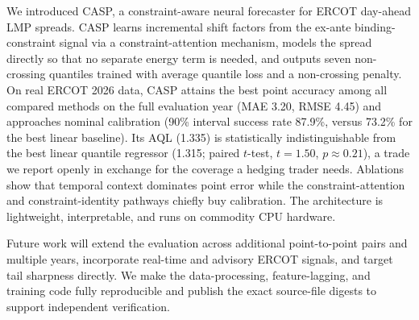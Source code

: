 \documentclass{article}
\begin{document}
We introduced CASP, a constraint-aware neural forecaster for ERCOT day-ahead LMP spreads. CASP learns incremental shift factors from the ex-ante binding-constraint signal via a constraint-attention mechanism, models the spread directly so that no separate energy term is needed, and outputs seven non-crossing quantiles trained with average quantile loss and a non-crossing penalty. On real ERCOT 2026 data, CASP attains the best point accuracy among all compared methods on the full evaluation year (MAE 3.20, RMSE 4.45) and approaches nominal calibration (90\% interval success rate 87.9\%, versus 73.2\% for the best linear baseline). Its AQL (1.335) is statistically indistinguishable from the best linear quantile regressor (1.315; paired $t$-test, $t=1.50$, $p \approx 0.21$), a trade we report openly in exchange for the coverage a hedging trader needs. Ablations show that temporal context dominates point error while the constraint-attention and constraint-identity pathways chiefly buy calibration. The architecture is lightweight, interpretable, and runs on commodity CPU hardware.

Future work will extend the evaluation across additional point-to-point pairs and multiple years, incorporate real-time and advisory ERCOT signals, and target tail sharpness directly. We make the data-processing, feature-lagging, and training code fully reproducible and publish the exact source-file digests to support independent verification.



\end{document}
